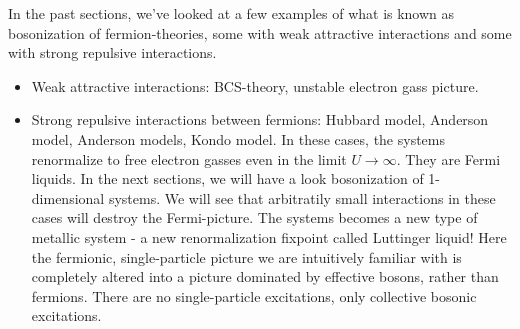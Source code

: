 In the past sections, we've looked at a few examples of what is known as bosonization of fermion-theories, some with weak attractive interactions and some with strong repulsive interactions. 

\begin{itemize}
    \item Weak attractive interactions: BCS-theory, unstable electron gass picture.
    \item Strong repulsive interactions between fermions: Hubbard model, Anderson model, Anderson models, Kondo model. In these cases, the systems renormalize to free electron gasses even in the limit $U \to \infty$. They are Fermi liquids. In the next sections, we will have a look bosonization of 1-dimensional systems. We will see that arbitratily small interactions in these cases will destroy the Fermi-picture. The systems becomes a new type of metallic system - a new renormalization fixpoint called Luttinger liquid! Here the fermionic, single-particle picture we are intuitively familiar with is completely altered into a picture dominated by effective bosons, rather than fermions. There are no single-particle excitations, only collective bosonic excitations. 
\end{itemize}
